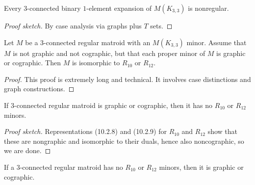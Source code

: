 \begin{lemma}[10.3.6]
  \label{lem:10.3.6}
  Every $3$-connected binary $1$-element expansion of $M(K_{3,3})$ is nonregular.
\end{lemma}

\begin{proof}[Proof sketch]
  By case analysis via graphs plus $T$ sets.
\end{proof}

\begin{theorem}[10.3.11]
  \label{thm:10.3.11}
  Let $M$ be a $3$-connected regular matroid with an $M(K_{3,3})$ minor. Assume that $M$ is not graphic and not cographic, but that each proper minor of $M$ is graphic or cographic.
  Then $M$ is isomorphic to $R_{10}$ or $R_{12}$.
\end{theorem}

\begin{proof}
  This proof is extremely long and technical. It involves case distinctions and graph constructions.
\end{proof}

\begin{theorem}[10.4.1 only if]
  \label{thm:10.4.1.only_if}
  If $3$-connected regular matroid is graphic or cographic, then it has no $R_{10}$ or $R_{12}$ minors.
\end{theorem}

\begin{proof}[Proof sketch]
  Representations (10.2.8) and (10.2.9) for $R_{10}$ and $R_{12}$ show that these are nongraphic and isomorphic to their duals, hence also noncographic, so we are done.
\end{proof}

\begin{theorem}[10.4.1 if]
  \label{thm:10.4.1.if}
  If a $3$-connected regular matroid has no $R_{10}$ or $R_{12}$ minors, then it is graphic or cographic.
\end{theorem}

